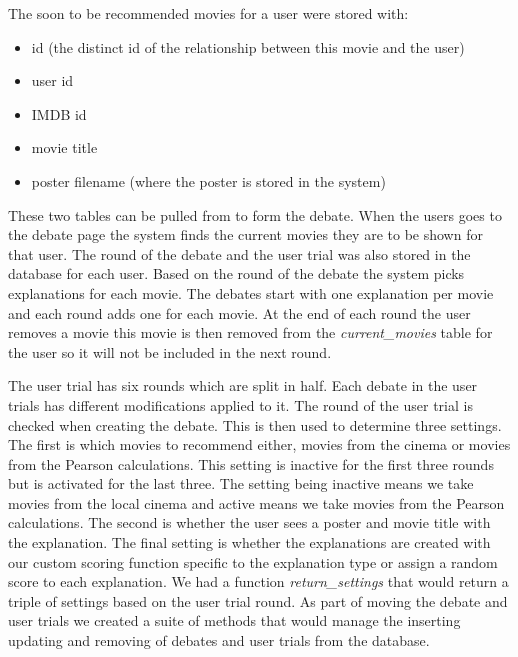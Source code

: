                 The soon to be recommended movies for a user were stored with:
                \begin{itemize}
                    \item id (the distinct id of the relationship between this movie and the user)
                    \item user id 
                    \item IMDB id 
                    \item movie title
                    \item poster filename (where the poster is stored in the system)
                    
                \end{itemize}

                These two tables can be pulled from to form the debate. When the users goes to the debate page the system finds the current movies they are to be shown for that user. The round of the debate and the user trial was also stored in the database for each user. Based on the round of the debate the system picks explanations for each movie. The debates start with one explanation per movie and each round adds one for each movie. At the end of each round the user removes a movie this movie is then removed from the \textit{current\_movies} table for the user so it will not be included in the next round. 
                
                The user trial has six rounds which are split in half. Each debate in the user trials has different modifications applied to it. The round of the user trial is checked when creating the debate. This is then used to determine three settings. The first is which movies to recommend either, movies from the cinema or movies from the Pearson calculations. This setting is inactive for the first three rounds but is activated for the last three. The setting being inactive means we take movies from the local cinema and active means we take movies from the Pearson calculations. The second is whether the user sees a poster and movie title with the explanation. The final setting is whether the explanations are created with our custom scoring function specific to the explanation type or assign a random score to each explanation. We had a function \textit{return\_settings} that would return a triple of settings based on the user trial round. As part of moving the debate and user trials we created a suite of methods that would manage the inserting updating and removing of debates and user trials from the database.
                
